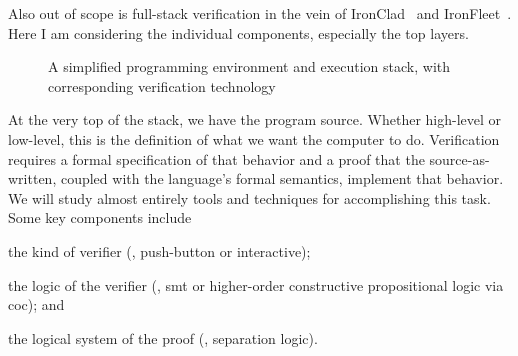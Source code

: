 Also out of scope is full-stack verification in the vein of
IronClad~\cite{hawblitzel2014ironclad} and
IronFleet~\cite{hawblitzel2015ironfleet}. Here I am considering the individual
components, especially the top layers.

\begin{figure}[hb]
    \centering
    \caption{A simplified programming environment and execution stack, with corresponding verification technology}\label{F:abstraction}
\end{figure}

At the very top of the stack, we have the program source. Whether high-level or
low-level, this is the definition of what we want the computer to do.
Verification requires a formal specification of that behavior and a proof that
the source-as-written, coupled with the language's formal semantics, implement
that behavior. We will study almost entirely tools and techniques for
accomplishing this task. Some key components include
\begin{inlist}
\item the kind of verifier (\eg, push-button or interactive);
\item the logic of the verifier (\eg, \gls{smt} or higher-order constructive
    propositional logic via \gls{coc}); and
\item the logical system of the proof (\eg, separation logic).
\end{inlist}

